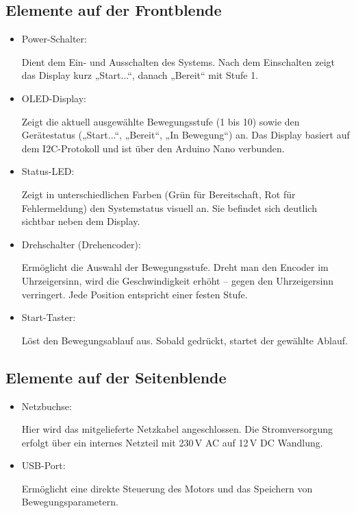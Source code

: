 \documentclass[a4paper,12pt]{report}
\begin{document}
	\subsection {Elemente auf der Frontblende }
	\begin{itemize}[leftmargin=1.5em]
		
		\item Power-Schalter: 
		
		Dient dem Ein- und Ausschalten des Systems. Nach dem Einschalten zeigt das Display kurz „Start...“, danach „Bereit“ mit Stufe 1. \\
		
		\item OLED-Display: 
		
		Zeigt die aktuell ausgewählte Bewegungsstufe (1 bis 10) sowie den Gerätestatus („Start...“, „Bereit“, „In Bewegung“) an. Das Display basiert auf dem I2C-Protokoll und ist über den Arduino Nano verbunden.\\
		
		\item Status-LED: 
		
		Zeigt in unterschiedlichen Farben (Grün für Bereitschaft, Rot für Fehlermeldung) den Systemstatus visuell an. Sie befindet sich deutlich sichtbar neben dem Display.\\ 
		
		\item Drehschalter (Drehencoder): 
		
		Ermöglicht die Auswahl der Bewegungsstufe. Dreht man den Encoder im Uhrzeigersinn, wird die Geschwindigkeit erhöht – gegen den Uhrzeigersinn verringert. Jede Position entspricht einer festen Stufe.\\
		
		\item Start-Taster: 
		
		Löst den Bewegungsablauf aus. Sobald gedrückt, startet der gewählte Ablauf.\\ 
		
	\end{itemize}
	\newpage
	
	\subsection{Elemente auf der Seitenblende}
	\begin{itemize}[leftmargin=1.5em]
		
		\item Netzbuchse: 
		
		Hier wird das mitgelieferte Netzkabel angeschlossen. Die Stromversorgung erfolgt über ein internes Netzteil mit 230 V AC auf 12 V DC Wandlung. \\
		
		\item USB-Port:
		
		Ermöglicht eine direkte Steuerung des Motors und das Speichern von Bewegungsparametern.\\
		
	\end{itemize}
	
\end{document}
